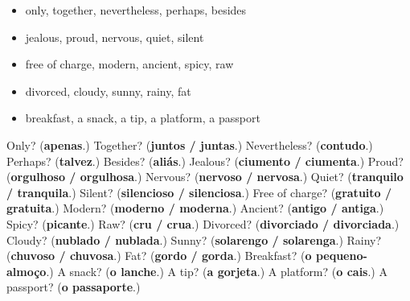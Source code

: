 \begin{itemize}
\raggedright
  \item only, together, nevertheless, perhaps, besides
  \item jealous, proud, nervous, quiet, silent
  \item free of charge, modern, ancient, spicy, raw
  \item divorced, cloudy, sunny, rainy, fat
  \item breakfast, a snack, a tip, a platform, a passport
\end{itemize}

\begin{tcolorbox}[breakable,colback=teal!4,colframe=teal!35!black,title={Before you move on}]
Only? (\textbf{apenas}.) Together? (\textbf{juntos / juntas}.) Nevertheless? (\textbf{contudo}.) Perhaps? (\textbf{talvez}.) Besides? (\textbf{aliás}.) Jealous? (\textbf{ciumento / ciumenta}.) Proud? (\textbf{orgulhoso / orgulhosa}.) Nervous? (\textbf{nervoso / nervosa}.) Quiet? (\textbf{tranquilo / tranquila}.) Silent? (\textbf{silencioso / silenciosa}.) Free of charge? (\textbf{gratuito / gratuita}.) Modern? (\textbf{moderno / moderna}.) Ancient? (\textbf{antigo / antiga}.) Spicy? (\textbf{picante}.) Raw? (\textbf{cru / crua}.) Divorced? (\textbf{divorciado / divorciada}.) Cloudy? (\textbf{nublado / nublada}.) Sunny? (\textbf{solarengo / solarenga}.) Rainy? (\textbf{chuvoso / chuvosa}.) Fat? (\textbf{gordo / gorda}.) Breakfast? (\textbf{o pequeno-almoço}.) A snack? (\textbf{o lanche}.) A tip? (\textbf{a gorjeta}.) A platform? (\textbf{o cais}.) A passport? (\textbf{o passaporte}.)
\end{tcolorbox}
